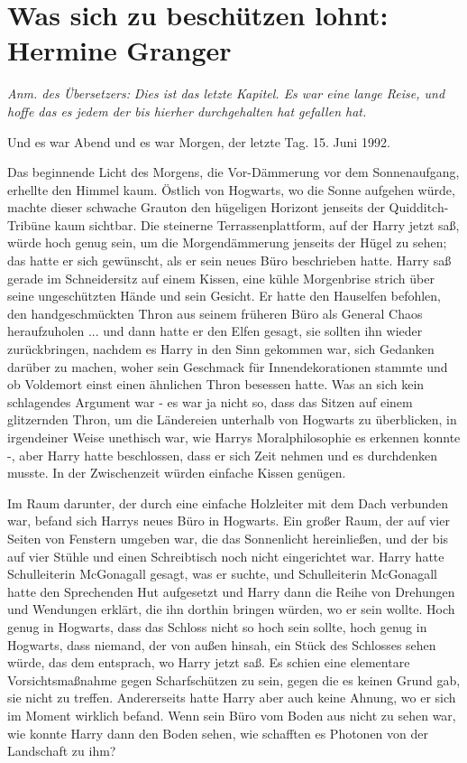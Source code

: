 \chapter{Was sich zu beschützen lohnt: Hermine Granger}

\emph{Anm. des Übersetzers:}
\emph{Dies ist das letzte Kapitel. Es war eine lange Reise, und hoffe das es
jedem der bis hierher durchgehalten hat gefallen hat.}

Und es war Abend und es war Morgen, der letzte Tag. 15. Juni 1992.

Das beginnende Licht des Morgens, die Vor-Dämmerung vor dem Sonnenaufgang,
erhellte den Himmel kaum. Östlich von Hogwarts, wo die Sonne aufgehen würde,
machte dieser schwache Grauton den hügeligen Horizont jenseits der
Quidditch-Tribüne kaum sichtbar. Die steinerne Terrassenplattform, auf der Harry
jetzt saß, würde hoch genug sein, um die Morgendämmerung jenseits der Hügel zu
sehen; das hatte er sich gewünscht, als er sein neues Büro beschrieben hatte.
Harry saß gerade im Schneidersitz auf einem Kissen, eine kühle Morgenbrise
strich über seine ungeschützten Hände und sein Gesicht. Er hatte den Hauselfen
befohlen, den handgeschmückten Thron aus seinem früheren Büro als General Chaos
heraufzuholen ... und dann hatte er den Elfen gesagt, sie sollten ihn wieder
zurückbringen, nachdem es Harry in den Sinn gekommen war, sich Gedanken darüber
zu machen, woher sein Geschmack für Innendekorationen stammte und ob Voldemort
einst einen ähnlichen Thron besessen hatte. Was an sich kein schlagendes
Argument war - es war ja nicht so, dass das Sitzen auf einem glitzernden Thron,
um die Ländereien unterhalb von Hogwarts zu überblicken, in irgendeiner Weise
unethisch war, wie Harrys Moralphilosophie es erkennen konnte -, aber Harry
hatte beschlossen, dass er sich Zeit nehmen und es durchdenken musste. In der
Zwischenzeit würden einfache Kissen genügen.

Im Raum darunter, der durch eine einfache Holzleiter mit dem Dach verbunden war,
befand sich Harrys neues Büro in Hogwarts. Ein großer Raum, der auf vier Seiten
von Fenstern umgeben war, die das Sonnenlicht hereinließen, und der bis auf vier
Stühle und einen Schreibtisch noch nicht eingerichtet war. Harry hatte
Schulleiterin McGonagall gesagt, was er suchte, und Schulleiterin McGonagall
hatte den Sprechenden Hut aufgesetzt und Harry dann die Reihe von Drehungen und
Wendungen erklärt, die ihn dorthin bringen würden, wo er sein wollte. Hoch genug
in Hogwarts, dass das Schloss nicht so hoch sein sollte, hoch genug in Hogwarts,
dass niemand, der von außen hinsah, ein Stück des Schlosses sehen würde, das dem
entsprach, wo Harry jetzt saß. Es schien eine elementare Vorsichtsmaßnahme gegen
Scharfschützen zu sein, gegen die es keinen Grund gab, sie nicht zu treffen.
Andererseits hatte Harry aber auch keine Ahnung, wo er sich im Moment wirklich
befand. Wenn sein Büro vom Boden aus nicht zu sehen war, wie konnte Harry dann
den Boden sehen, wie schafften es Photonen von der Landschaft zu ihm?

